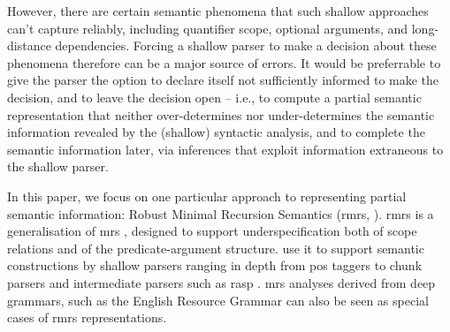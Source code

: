 However, there are certain semantic
phenomena that such shallow
approaches can't capture reliably, including quantifier scope, optional
arguments,
% 
and long-distance dependencies.  
Forcing a shallow parser
to make a decision about these phenomena therefore can be a major source
of errors.  It would be preferrable to give the parser the option to
declare itself not sufficiently informed to make the decision, and
to leave the decision open -- i.e., to compute a partial semantic
representation that neither over-determines nor under-determines the
semantic information revealed by the (shallow) syntactic analysis, and
to complete the semantic information later, via inferences that
exploit information extraneous to the shallow parser.

In this paper, we focus on one particular approach to representing
partial semantic information:
Robust Minimal Recursion Semantics ({\sc rmrs},
\cite{copestake:2003}).  {\sc rmrs} is a generalisation of {\sc mrs}
\cite{copestake:etal:2005}, designed to support underspecification both
of scope relations and of the predicate-argument structure.
\cite{copestake:2003, frank:2004} use it to
support semantic constructions by shallow parsers
ranging in depth from {\sc pos} taggers to chunk parsers  
and intermediate parsers such as {\sc rasp}
\cite{briscoe:etal:2006}.  {\sc mrs} analyses
derived from deep grammars, such as the English Resource Grammar
\cite{copestake:flickinger:2000} can also be seen as special cases of
{\sc rmrs} representations.

